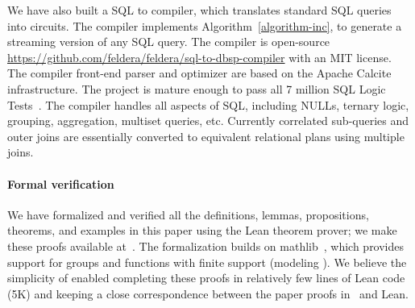 We have also built a SQL to \dbsp compiler, which translates standard
SQL queries into \dbsp circuits.  The compiler implements
Algorithm~\ref{algorithm-inc}, to generate a streaming version of any
SQL query.  The compiler is open-source
\url{https://github.com/feldera/feldera/sql-to-dbsp-compiler} with
an MIT license.  The compiler front-end parser and optimizer are based
on the Apache Calcite~\cite{begoli-icmd18} infrastructure.  The
project is mature enough to pass all 7 million SQL Logic
Tests~\cite{sqllogictest}.  The compiler handles all aspects of SQL,
including NULLs, ternary logic, grouping, aggregation, multiset
queries, etc.  Currently correlated sub-queries and outer joins are
essentially converted to equivalent relational plans using multiple
joins.

\paragraph{Formal verification}

We have formalized and verified all the definitions, lemmas,
propositions, theorems, and examples in this paper using the Lean theorem prover; we make
these proofs available at~\cite{dbsp-theory}.
The formalization builds on mathlib~\cite{mathlib2020}, which provides
support for groups and functions with finite support (modeling
\zrs). We believe the simplicity of \dbsp enabled completing these
proofs in relatively few lines of Lean code (5K) and keeping a close
correspondence between the paper proofs in~\cite{tr} and Lean.
